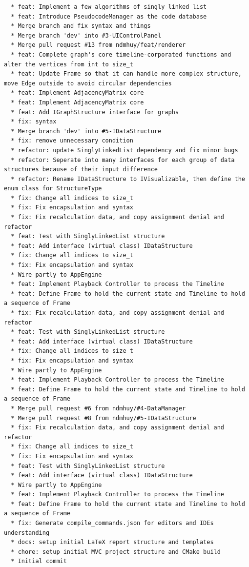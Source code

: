 \begin{small}
\begin{verbatim}
  * feat: Implement a few algorithms of singly linked list
  * feat: Introduce PseudocodeManager as the code database
  * Merge branch and fix syntax and things
  * Merge branch 'dev' into #3-UIControlPanel
  * Merge pull request #13 from ndmhuy/feat/renderer
  * feat: Complete graph's core timeline-corporated functions and alter the vertices from int to size_t
  * feat: Update Frame so that it can handle more complex structure, move Edge outside to avoid circular dependencies
  * feat: Implement AdjacencyMatrix core
  * feat: Implement AdjacencyMatrix core
  * feat: Add IGraphStructure interface for graphs
  * fix: syntax
  * Merge branch 'dev' into #5-IDataStructure
  * fix: remove unnecessary condition
  * refactor: update SinglyLinkedList dependency and fix minor bugs
  * refactor: Seperate into many interfaces for each group of data structures because of their input difference
  * refactor: Rename IDataStructure to IVisualizable, then define the enum class for StructureType
  * fix: Change all indices to size_t
  * fix: Fix encapsulation and syntax
  * fix: Fix recalculation data, and copy assignment denial and refactor
  * feat: Test with SinglyLinkedList structure
  * feat: Add interface (virtual class) IDataStructure
  * fix: Change all indices to size_t
  * fix: Fix encapsulation and syntax
  * Wire partly to AppEngine
  * feat: Implement Playback Controller to process the Timeline
  * feat: Define Frame to hold the current state and Timeline to hold a sequence of Frame
  * fix: Fix recalculation data, and copy assignment denial and refactor
  * feat: Test with SinglyLinkedList structure
  * feat: Add interface (virtual class) IDataStructure
  * fix: Change all indices to size_t
  * fix: Fix encapsulation and syntax
  * Wire partly to AppEngine
  * feat: Implement Playback Controller to process the Timeline
  * feat: Define Frame to hold the current state and Timeline to hold a sequence of Frame
  * Merge pull request #6 from ndmhuy/#4-DataManager
  * Merge pull request #8 from ndmhuy/#5-IDataStructure
  * fix: Fix recalculation data, and copy assignment denial and refactor
  * fix: Change all indices to size_t
  * fix: Fix encapsulation and syntax
  * feat: Test with SinglyLinkedList structure
  * feat: Add interface (virtual class) IDataStructure
  * Wire partly to AppEngine
  * feat: Implement Playback Controller to process the Timeline
  * feat: Define Frame to hold the current state and Timeline to hold a sequence of Frame
  * fix: Generate compile_commands.json for editors and IDEs understanding
  * docs: setup initial LaTeX report structure and templates
  * chore: setup initial MVC project structure and CMake build
  * Initial commit



\end{verbatim}
\end{small}
